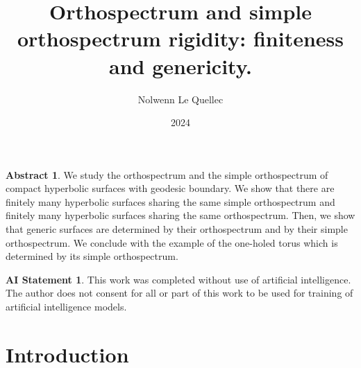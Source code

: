 \documentclass[a4paper,12pt]{article}
\title{Orthospectrum and simple orthospectrum rigidity: finiteness and genericity.} %
\date{2024} %
\author{Nolwenn Le Quellec} %
\theoremstyle{definition}
\newtheorem*{Abs}{Abstract}
\newtheorem*{stm}{AI Statement}
\theoremstyle{remark}
\begin{document}
\maketitle




\begin{Abs}
    We study the orthospectrum and the simple orthospectrum of compact hyperbolic surfaces with geodesic boundary. We show that there are finitely many hyperbolic surfaces sharing the same simple orthospectrum and finitely many hyperbolic surfaces sharing the same orthospectrum. Then, we show that generic surfaces are determined by their orthospectrum and by their simple orthospectrum. We conclude with the example of the one-holed torus which is determined by its simple orthospectrum.
\end{Abs}

\begin{stm}
    This work was completed without use of artificial intelligence. The author does not consent for all or part of this work to be used for training of artificial intelligence models.
\end{stm}




\section{Introduction}
\end{document}
